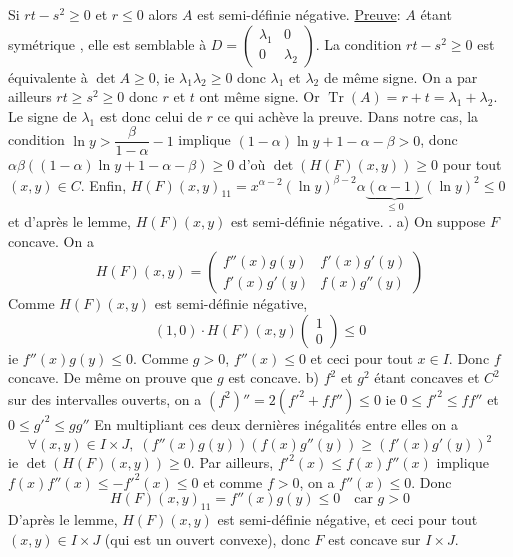 \documentclass{fancybook}
\DeclareMathOperator{\Tr}{Tr}
\begin{document}
Si $rt-s^2\geq 0$ et $r\leq 0$ alors $A$ est semi-définie négative.\newline \newline
\underline{Preuve}: $A$ étant symétrique , elle est semblable à $D=\begin{pmatrix}
\lambda_1 & 0\\
0 & \lambda_2
\end{pmatrix}$. La condition $rt-s^2\geq 0$ est équivalente à $\det A\geq 0$, ie $\lambda_1 \lambda_2\geq 0$ donc $\lambda_1$ et $\lambda_2$ de même signe. On a par ailleurs $rt\geq s^2\geq 0$ donc $r$ et $t$ ont même signe. Or $\Tr(A)=r+t=\lambda_1 + \lambda_2$. Le signe de $\lambda_1$ est donc celui de $r$ ce qui achève la preuve. \newline
\newline
Dans notre cas, la condition $\ln y > \dfrac{\beta}{1-\alpha}-1$ implique $(1-\alpha)\ln y + 1-\alpha - \beta >0$, donc $\alpha \beta ((1-\alpha)\ln y + 1-\alpha - \beta) \geq 0$ d'où $\det (H(F)(x,y)) \geq 0$ pour tout $(x,y)\in C$.\newline
Enfin, $H(F)(x,y)_{11} = x^{\alpha -2}(\ln y)^{\beta-2}\alpha\underbrace{(\alpha -1)}_{\leq 0}(\ln y)^2\leq 0$ et d'après le lemme, $H(F)(x,y)$ est semi-définie négative. \newline 
{}. a) On suppose $F$ concave. On a $$H(F)(x,y) = \begin{pmatrix}
f''(x)g(y) & f'(x)g'(y) \\
f'(x)g'(y) & f(x)g''(y)
\end{pmatrix}$$
Comme $H(F)(x,y)$ est semi-définie négative, $$(1,0)\cdot H(F)(x,y) \begin{pmatrix}
1 \\0
\end{pmatrix} \leq 0$$
ie $f''(x)g(y)\leq 0$. Comme $g>0$, $f''(x)\leq 0$ et ceci pour tout $x\in I$. Donc $f$ concave.\newline
De même on prouve que $g$ est concave.\newline 
\newline
b) $f^2$ et $g^2$ étant concaves et $C^2$ sur des intervalles ouverts, on a $(f^2)''=2(f'^2+ff'')\leq 0$ ie $0\leq f'^2\leq ff'' $ et $0\leq g'^2\leq gg'' $
En multipliant ces deux dernières inégalités entre elles on a $$\forall(x,y)\in I\times J,\; (f''(x)g(y))(f(x)g''(y))\geq (f'(x)g'(y))^2$$
ie $\det(H(F)(x,y))\geq 0$.\newline
Par ailleurs, $f'^2(x)\leq f(x)f''(x)$ implique $f(x)f''(x)\leq -f'^2(x)\leq 0 $ et comme $f>0$, on a $f''(x)\leq 0$. Donc $$H(F)(x,y)_{11}=f''(x)g(y)\leq 0 \quad \text{car } g>0$$
D'après le lemme, $H(F)(x,y)$ est semi-définie négative, et ceci pour tout $(x,y)\in I\times J$ (qui est un ouvert convexe), donc $F$ est concave sur $I\times J$.
\end{document}
